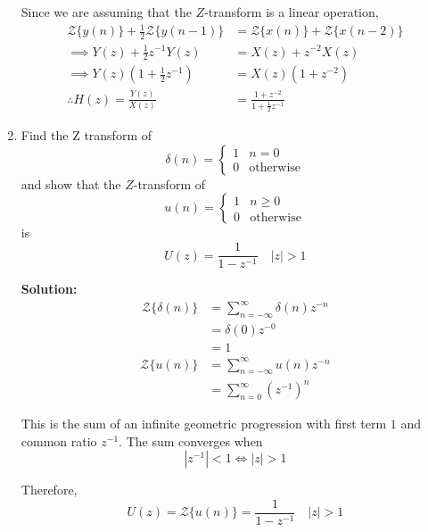 \documentclass[journal,12pt,twocolumn]{IEEEtran}
\newcommand{\solution}{\noindent \textbf{Solution: }}
\providecommand{\brak}[1]{\ensuremath{\left(#1\right)}}
\providecommand{\abs}[1]{\left\vert#1\right\vert}
\providecommand{\z}[1]{{\mathcal{Z}}\{#1\}}
\numberwithin{equation}{section}
\renewcommand\thesection{\arabic{section}}
\begin{document}
\begin{enumerate}[label=\thesection.\arabic*]
	Since we are assuming that the $Z$-transform is a linear operation,
	\begin{align}
		\z{y(n)} + \frac12 \z{y(n-1)} &= \z{x(n)} + \z{x(n-2)} \\
		\implies Y(z) + \frac12 z^{-1} Y(z) &= X(z) + z^{-2} X(z) \\
		\implies Y(z) \brak{1 + \frac12 z^{-1}} &= X(z) (1 + z^{-2}) \\
		\therefore H(z) = \frac{Y(z)}{X(z)} &= \frac{1 + z^{-2}}{1 + \frac12 z^{-1}}
	\end{align}
	
	\item Find the Z transform of 
	\begin{equation}
		\delta(n) =
		\begin{cases}
			1 & n = 0 \\
			0 & \text{otherwise}
		\end{cases}
	\end{equation}
	and show that the $Z$-transform of
	\begin{equation}
	\label{eq:unit_step}
	u(n) =
	\begin{cases}
		1 & n \ge 0 \\
		0 & \text{otherwise}	
	\end{cases}
	\end{equation}
	is
	\begin{equation}
		U(z) = \frac{1}{1-z^{-1}} \quad \abs{z} > 1
	\end{equation}
	
	\solution 
	\begin{align}
		\z{\delta(n)} &= \sum _{n=-\infty }^{\infty }\delta(n)z^{-n} \\
		&= \delta(0) z^{-0} \\
		&= 1 
	\end{align}
	\begin{align}
		\z{u(n)} &= \sum _{n=-\infty }^{\infty } u(n)z^{-n} \\
		&= \sum _{n=0}^{\infty } \brak{z^{-1}}^n 
	\end{align}
	
	This is the sum of an infinite geometric progression with first term $1$ and common ratio $z^{-1}$. The sum converges when
	\begin{equation}
		\abs{z^{-1}} < 1 \iff \abs{z} > 1
	\end{equation}
	
	Therefore,
	\begin{equation}
		U(z) = \z{u(n)} = \frac{1}{1 - z^{-1}} \quad \abs{z} > 1
	\end{equation}


\end{enumerate}
\end{document}
